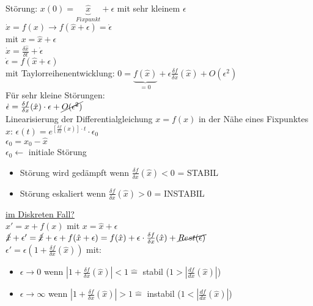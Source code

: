 Störung: $x(0)=\underbrace{\hat{x}}_{Fixpunkt} + \epsilon$ mit sehr kleinem $\epsilon$\\
$\dot{x}=f(x) \rightarrow f(\hat{x} + \epsilon) = \dot{\epsilon}$\\
mit $x=\hat{x}+\epsilon$\\
$\dot{x}=\frac{\delta \hat{x}}{\delta t} + \dot{\epsilon}$\\
\underline{$\dot{\epsilon}=f(\hat{x}+\epsilon)$}\\
mit Taylorreihenentwicklung: $0=\underbrace{f(\hat{x})}_{=0} + \epsilon \frac{\delta f}{\delta x} (\hat{x}) + O(\epsilon^2)$\\

Für sehr kleine Störungen:\\
$\dot{\epsilon}=\frac{\delta f}{\delta x} (\hat{x}) \cdot \epsilon + \cancel{O(\epsilon^2)}$\\
Linearisierung der Differentialgleichung $x=f(x)$ in der Nähe eines Fixpunktes $\hat{x}$:
$\epsilon(t)=e^{[\frac{\delta f}{\delta x} (\hat{x})] \cdot t} \cdot \epsilon_0$\\
$\epsilon_0=x_0 - \hat{x}$\\
$\epsilon_0 \leftarrow $ initiale Störung\\

\begin{itemize}
	\item Störung wird gedämpft wenn $\frac{\delta f}{\delta x} (\hat{x}) < 0$ = STABIL
	\item Störung eskaliert wenn $\frac{\delta f}{\delta x} (\hat{x}) > 0$ = INSTABIL
\end{itemize}

\underline{im Diskreten Fall?}\\
$x'=x + f(x)$ mit $x=\hat{x} + \epsilon$\\
$\cancel{\hat{x}} + \epsilon' = \cancel{\hat{x}} + \epsilon + f(\hat{x} + \epsilon)=f(\hat{x}) + \epsilon \cdot \frac{\delta f}{\delta x} (\hat{x}) + \cancel{Rest(\epsilon)}$\\
$\epsilon'=\epsilon (1 + \frac{\delta f}{\delta x} (\hat{x}))$
mit:
\begin{itemize}
	\item $\epsilon \rightarrow 0$ wenn $|1+\frac{\delta f}{\delta x} (\hat{x})| < 1 \hat{=}$ stabil ($1 > |\frac{df}{dx} (\hat{x})|$)
	\item $\epsilon \rightarrow \infty$ wenn $|1+\frac{\delta f}{\delta x} (\hat{x})| > 1 \hat{=}$ instabil ($1 < |\frac{df}{dx} (\hat{x})|$)
\end{itemize}

